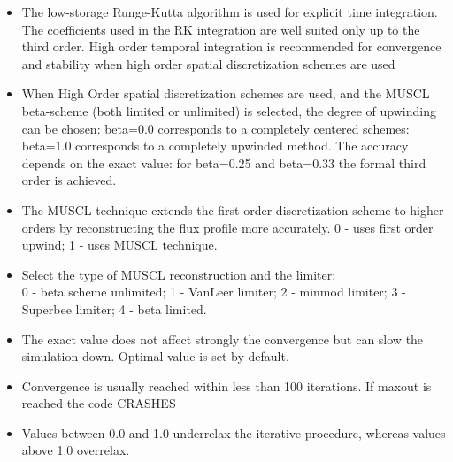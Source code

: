 \begin{itemize}

\item
{}
{The low-storage Runge-Kutta algorithm is used for explicit time integration.
The coefficients used in the RK integration are well suited only up to the
third order. High order temporal integration is recommended for 
convergence and stability when high order spatial discretization schemes 
are used}

\item
{}
{When High Order spatial discretization schemes are used, and the MUSCL 
beta-scheme (both limited or unlimited) is selected, the degree of upwinding
can be chosen: beta=0.0 corresponds to a completely centered schemes:
beta=1.0 corresponds to a completely upwinded method. The accuracy depends
on the exact value: for beta=0.25 and beta=0.33 the formal third order
is achieved.}

\item
{}
{The MUSCL technique extends the first order discretization
scheme to higher orders by reconstructing the flux profile more accurately.
0 - uses first order upwind; 1 - uses MUSCL technique.}

\item
{}
{Select the type of MUSCL reconstruction and the limiter:\\
0 - beta scheme unlimited; 1 - VanLeer limiter; 2 - minmod limiter;
3 - Superbee limiter; 4 - beta limited.}

\item
{}
{The exact value does not affect strongly the convergence but can slow
the simulation down. Optimal value is set by default.}

\item
{}
{Convergence is usually reached within less than 100 iterations. If maxout is reached the code CRASHES}

\item
{}
{Values between 0.0 and 1.0 underrelax the iterative procedure, whereas
values above 1.0 overrelax.}

\end{itemize}

